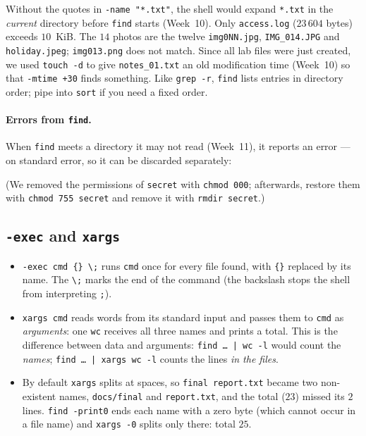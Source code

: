 \documentclass[11pt,a4paper]{article}
\newcommand{\cmd}[1]{\texttt{#1}}
\begin{document}
Without the quotes in \cmd{-name "*.txt"}, the shell would expand \texttt{*.txt} in the \emph{current} directory before \cmd{find} starts (Week~10). Only \texttt{access.log} ($23\,604$ bytes) exceeds $10$~KiB. The $14$ photos are the twelve \texttt{img0NN.jpg}, \texttt{IMG\_014.JPG} and \texttt{holiday.jpeg}; \texttt{img013.png} does not match. Since all lab files were just created, we used \cmd{touch -d} to give \texttt{notes\_01.txt} an old modification time (Week~10) so that \cmd{-mtime +30} finds something. Like \cmd{grep -r}, \cmd{find} lists entries in directory order; pipe into \cmd{sort} if you need a fixed order.

\paragraph{Errors from \texttt{find}.} When \cmd{find} meets a directory it may not read (Week~11), it reports an error --- on standard error, so it can be discarded separately:

(We removed the permissions of \texttt{secret} with \cmd{chmod 000}; afterwards, restore them with \cmd{chmod 755 secret} and remove it with \cmd{rmdir secret}.)

\subsection{\texttt{-exec} and \texttt{xargs}}



\begin{itemize}
  \item \cmd{-exec cmd \{\} \textbackslash;} runs \cmd{cmd} once for every file found, with \texttt{\{\}} replaced by its name. The \texttt{\textbackslash;} marks the end of the command (the backslash stops the shell from interpreting \texttt{;}).
  \item \cmd{xargs cmd} reads words from its standard input and passes them to \cmd{cmd} as \emph{arguments}: one \cmd{wc} receives all three names and prints a total. This is the difference between data and arguments: \cmd{find \dots{} | wc -l} would count the \emph{names}; \cmd{find \dots{} | xargs wc -l} counts the lines \emph{in the files}.
  \item By default \cmd{xargs} splits at spaces, so \texttt{final report.txt} became two non-existent names, \texttt{docs/\allowbreak final} and \texttt{report.txt}, and the total ($23$) missed its $2$ lines. \cmd{find -print0} ends each name with a zero byte (which cannot occur in a file name) and \cmd{xargs -0} splits only there: total $25$.
\end{itemize}
\end{document}
